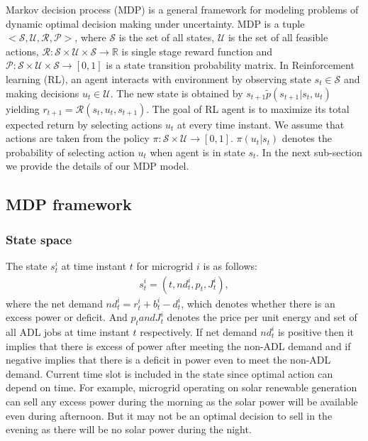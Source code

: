 Markov decision process (MDP)  is a general framework for modeling problems of dynamic optimal decision making under uncertainty. MDP is a tuple $<\mathcal{S},\mathcal{U},\mathcal{R},\mathcal{P}>$, where $\mathcal{S}$ is the set of all states, $\mathcal{U}$ is the set of all feasible actions, $\mathcal{R}:\mathcal{S}\times\mathcal{U}\times\mathcal{S}\to \mathbb{R} $ is single stage reward function and $\mathcal{P}:\mathcal{S}\times\mathcal{U}\times\mathcal{S} \to [0,1]$ is a state transition probability matrix. In Reinforcement learning (RL), an agent interacts with environment by observing state $s_t \in \mathcal{S}$ and  making decisions $u_t \in \mathcal{U}$. The new state is obtained by $s_{t+1} \tilde p(s_{t+1} | s_t,u_t)$ yielding $r_{t+1} = \mathcal{R}(s_t,u_t,s_{t+1})$. The goal of  RL agent is to maximize its total expected return by selecting actions $u_t$ at every time instant. We assume that actions are taken from the policy $\pi : \mathcal{S} \times \mathcal{U} \to [0,1]$. $\pi(u_t | s_t)$ denotes the probability of selecting action $u_t$ when agent is in state $s_t$. 
 In the next sub-section we provide the details of our MDP model.
\subsection{MDP framework}
\subsubsection{State space}
The state $s_{t}^{i}$ at time instant $t$  for microgrid $i$ is as follows:
\begin{align}
s_{t}^{i} = (t,nd_{t}^{i},p_{t}, J_{t}^{i}),
\end{align}
where the net demand $nd_{t}^{i} = r_{t}^{i} + b_{t}^{i} - d_{t}^{i}$, which denotes whether there is an excess power or deficit.  And $p_{t} and  J_{t}^{i}$ denotes the price per unit energy and set of all ADL jobs at time instant $t$ respectively. If  net demand $nd_{t}^{i}$ is positive then it implies that there is excess of power after meeting the non-ADL demand and if negative implies that there is a deficit in power even to meet the non-ADL demand. Current time slot is  included in the state since optimal action can depend on time. For example, microgrid operating on solar renewable generation can sell any excess power during the morning as the solar power will be available even during afternoon. But it may not be an optimal decision to sell in the evening as there will be no solar power during the night. 

